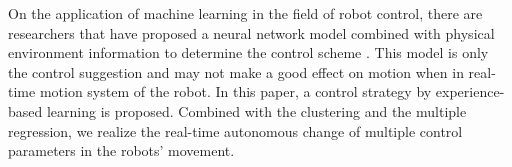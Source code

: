 On the application of machine learning in the field of robot control, there are researchers that have proposed a neural network model combined with physical environment information to determine the control scheme \cite{InformationDriven} \cite{NovelPlasticityRule}. This model is only the control suggestion and may not make a good effect on motion when in real-time motion system of the robot. In this paper, a control strategy by experience-based learning  is proposed. Combined with the clustering and the multiple regression, we realize the real-time autonomous change of multiple control parameters in the robots' movement.

